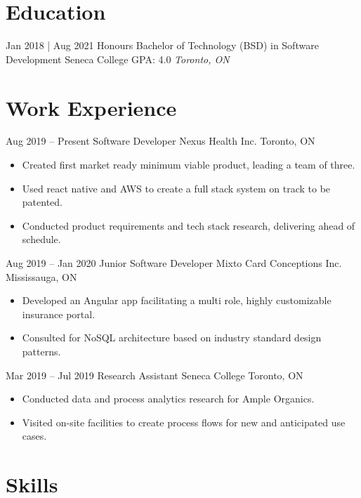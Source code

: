 \documentclass[letterpaper]{moderncv}        %
\begin{document}
\makecvtitle
    

\section{Education}
\cventry
{Jan 2018 | Aug 2021}
{Honours Bachelor of Technology (BSD) in Software Development}
{Seneca College}
{GPA: 4.0}
{\textit{Toronto, ON}}
{}
\section{Work Experience}
\cventry
{Aug 2019 -- Present}
{Software Developer}
{Nexus Health Inc.}
{Toronto, ON}
{}
{\begin{itemize}%
	\item Created first market ready minimum viable product, leading a team of three.
	\item Used react native and AWS to create a full stack system on track to be patented.
	\item Conducted product requirements and tech stack research, delivering ahead of schedule.
	\end{itemize}}
\cventry
{Aug 2019 -- Jan 2020}
{Junior Software Developer}
{Mixto Card Conceptions Inc.}
{Mississauga, ON}
{}
{\begin{itemize}%
	\item Developed an Angular app facilitating a multi role, highly customizable insurance portal.
	\item Consulted for NoSQL architecture based on industry standard design patterns.
	\end{itemize}}
\cventry
{Mar 2019 -- Jul 2019}
{Research Assistant}
{Seneca College}
{Toronto, ON}
{}
{\begin{itemize}%
	\item Conducted data and process analytics research for Ample Organics.
	\item Visited on-site facilities to create process flows for new and anticipated use cases.
	\end{itemize}}
\section{Skills}
\end{document}
